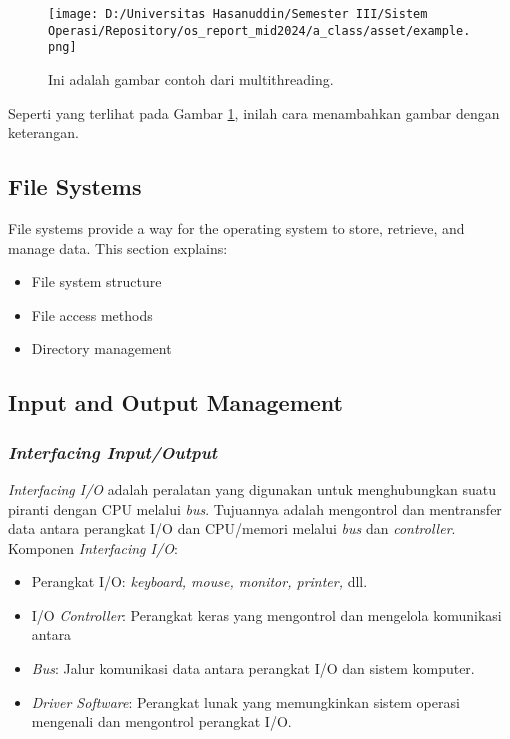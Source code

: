\documentclass[12pt]{article}
\begin{document}
\begin{figure}[h]
    \centering
    \texttt{[image: D:/Universitas Hasanuddin/Semester III/Sistem Operasi/Repository/os\_report\_mid2024/a\_class/asset/example.png]}  %
    \caption{Ini adalah gambar contoh dari multithreading.}
    \label{fig:contoh_gambar}
\end{figure}

Seperti yang terlihat pada Gambar \ref{fig:contoh_gambar}, inilah cara menambahkan gambar dengan keterangan.

\subsection{File Systems}
File systems provide a way for the operating system to store, retrieve, and manage data. This section explains:
\begin{itemize}
    \item File system structure
    \item File access methods
    \item Directory management
\end{itemize}

\subsection{Input and Output Management}
\subsubsection{\textit{Interfacing Input/Output}}
\textit{Interfacing I/O} adalah peralatan yang digunakan untuk menghubungkan suatu piranti dengan CPU melalui \textit{bus}. Tujuannya adalah mengontrol dan mentransfer data antara perangkat I/O dan CPU/memori melalui \textit{bus} dan \textit{controller}.
Komponen \textit{Interfacing I/O}:
\begin{itemize}
    \item Perangkat I/O: \textit{keyboard, mouse, monitor, printer,} dll.
    \item I/O \textit{Controller}: Perangkat keras yang mengontrol dan mengelola komunikasi antara 
    \item \textit{Bus}: Jalur komunikasi data antara perangkat I/O dan sistem komputer.
    \item \textit{Driver Software}: Perangkat lunak yang memungkinkan sistem operasi mengenali dan mengontrol perangkat I/O.
\end{itemize}
\end{document}
